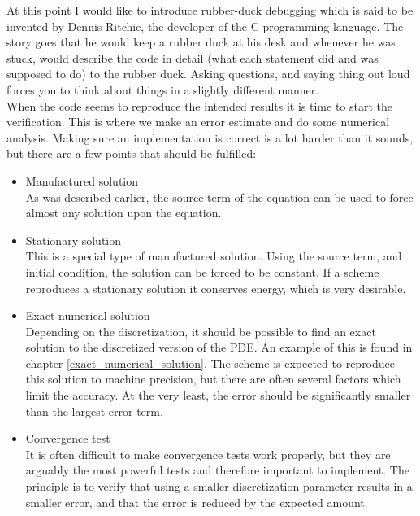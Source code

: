  
\noindent At this point I would like to introduce rubber-duck debugging which is said to be invented by Dennis Ritchie, the developer of the C programming language. 
The story goes that he would keep a rubber duck at his desk and whenever he was stuck, would describe the code in detail (what each statement did and was supposed to do) to the rubber duck. 
Asking questions, and saying thing out loud forces you to think about things in a slightly different manner. \\

\noindent When the code seems to reproduce the intended results it is time to start the verification. 
This is where we make an error estimate and do some numerical analysis. 
Making sure an implementation is correct is a lot harder than it sounds, but there are a few points that should be fulfilled:

\begin{itemize}
 \item Manufactured solution\\
 As was described earlier, the source term of the equation can be used to force almost any solution upon the equation. 
 
 \item Stationary solution\\
 This is a special type of manufactured solution. Using the source term, and initial condition, the solution can be forced to be constant. 
 If a scheme reproduces a stationary solution it conserves energy, which is very desirable.
 \item Exact numerical solution\\
 Depending on the discretization, it should be possible to find an exact solution to the discretized version of the PDE. 
 An example of this is found in chapter \ref{exact_numerical_solution}. 
 The scheme is expected to reproduce this solution to machine precision, but there are often several factors which limit the accuracy. 
 At the very least, the error should be significantly smaller than the largest error term. \\
 \item Convergence test\\
 It is often difficult to make convergence tests work properly, but they are arguably the most powerful tests and therefore important to implement. 
 The principle is to verify that using a smaller discretization parameter results in a smaller error, and that the error is reduced by the expected amount. 
\end{itemize}

